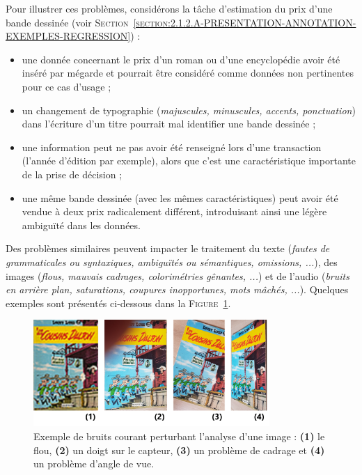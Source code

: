 			\begin{leftBarExamples}
				Pour illustrer ces problèmes, considérons la tâche d'estimation du prix d'une bande dessinée (voir \textsc{Section~\ref{section:2.1.2.A-PRESENTATION-ANNOTATION-EXEMPLES-REGRESSION}}) :
				\begin{itemize}
					\item une donnée concernant le prix d'un roman ou d'une encyclopédie avoir été inséré par mégarde et pourrait être considéré comme données non pertinentes pour ce cas d'usage ;
					\item un changement de typographie (\textit{majuscules, minuscules, accents, ponctuation}) dans l'écriture d'un titre pourrait mal identifier une bande dessinée ;
					\item une information peut ne pas avoir été renseigné lors d'une transaction (l'année d'édition par exemple), alors que c'est une caractéristique importante de la prise de décision ;
					\item une même bande dessinée (avec les mêmes caractéristiques) peut avoir été vendue à deux prix radicalement différent, introduisant ainsi une légère ambiguïté dans les données.
				\end{itemize}
				
				Des problèmes similaires peuvent impacter le traitement du texte (\textit{fautes de grammaticales ou syntaxiques, ambiguïtés ou sémantiques, omissions, ...}), des images (\textit{flous, mauvais cadrages, colorimétries gênantes, ...}) et de l'audio (\textit{bruits en arrière plan, saturations, coupures inopportunes, mots mâchés, ...}).
				Quelques exemples sont présentés ci-dessous dans la \textsc{Figure~\ref{figure:2.3.1.B-DEFIS-ANNOTATION-ASPECT-DONNEES-BRUITS}}.
				\begin{figure}[H]
					\centering
					\includegraphics[width=0.80\textwidth]{figures/etatdelart-morris-1958-lucky-luke-12-bruits}
					\caption{
						Exemple de bruits courant perturbant l'analyse d'une image :
						\textbf{(1)} le flou,
						\textbf{(2)} un doigt sur le capteur,
						\textbf{(3)} un problème de cadrage
						et \textbf{(4)} un problème d'angle de vue.
					}
					\label{figure:2.3.1.B-DEFIS-ANNOTATION-ASPECT-DONNEES-BRUITS}
				\end{figure}
			\end{leftBarExamples}
			
